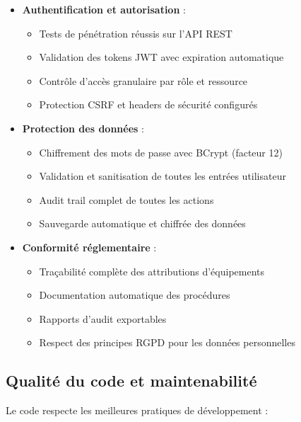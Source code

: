 \documentclass[12pt,a4paper]{report}
\begin{document}
\begin{itemize}
\item \textbf{Authentification et autorisation} :
  \begin{itemize}
  \item Tests de pénétration réussis sur l'API REST
  \item Validation des tokens JWT avec expiration automatique
  \item Contrôle d'accès granulaire par rôle et ressource
  \item Protection CSRF et headers de sécurité configurés
  \end{itemize}

\item \textbf{Protection des données} :
  \begin{itemize}
  \item Chiffrement des mots de passe avec BCrypt (facteur 12)
  \item Validation et sanitisation de toutes les entrées utilisateur
  \item Audit trail complet de toutes les actions
  \item Sauvegarde automatique et chiffrée des données
  \end{itemize}

\item \textbf{Conformité réglementaire} :
  \begin{itemize}
  \item Traçabilité complète des attributions d'équipements
  \item Documentation automatique des procédures
  \item Rapports d'audit exportables
  \item Respect des principes RGPD pour les données personnelles
  \end{itemize}
\end{itemize}

\subsection{Qualité du code et maintenabilité}
Le code respecte les meilleures pratiques de développement :
\end{document}
